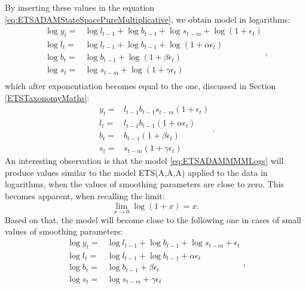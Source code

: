 \documentclass[]{book}
\theoremstyle{definition}
\theoremstyle{definition}
\theoremstyle{definition}
\theoremstyle{definition}
\theoremstyle{remark}
\begin{document}
By inserting these values in the equation \eqref{eq:ETSADAMStateSpacePureMultiplicative}, we obtain model in logarithms:
\begin{equation}
    \begin{aligned}
        \log y_t = & \log l_{t-1} + \log b_{t-1} + \log s_{t-m} + \log \left(1 + \epsilon_{t} \right) \\
        \log l_{t} = & \log l_{t-1} + \log b_{t-1} + \log( 1  + \alpha \epsilon_{t}) \\ 
        \log b_{t} = & \log b_{t-1} + \log( 1  + \beta \epsilon_{t}) \\
        \log s_{t} = & \log s_{t-m} + \log( 1  + \gamma \epsilon_{t}) \\
    \end{aligned} ,
    \label{eq:ETSADAMMMMLogs}
\end{equation}
which after exponentiation becomes equal to the one, discussed in Section \ref{ETSTaxonomyMaths}:
\begin{equation}
  \begin{aligned}
    y_{t} = & l_{t-1} b_{t-1} s_{t-m} (1 + \epsilon_t) \\
    l_t = & l_{t-1} b_{t-1} (1 + \alpha \epsilon_t) \\
    b_t = & b_{t-1} (1 + \beta \epsilon_t) \\
    s_t = & s_{t-m} (1 + \gamma \epsilon_t) 
  \end{aligned}.
  \label{eq:ETSADAMMMM}
\end{equation}
An interesting observation is that the model \eqref{eq:ETSADAMMMMLogs} will produce values similar to the model ETS(A,A,A) applied to the data in logarithms, when the values of smoothing parameters are close to zero. This becomes apparent, when recalling the limit:
\begin{equation}
  \lim\limits_{x \to 0}\log(1+x) = x .
  \label{eq:limitOf1x}
\end{equation}
Based on that, the model will become close to the following one in cases of small values of smoothing parameters:
\begin{equation}
    \begin{aligned}
        \log y_t = & \log l_{t-1} + \log b_{t-1} + \log s_{t-m} + \epsilon_{t} \\
        \log l_{t} = & \log l_{t-1} + \log b_{t-1} + \alpha \epsilon_{t} \\ 
        \log b_{t} = & \log b_{t-1} + \beta \epsilon_{t} \\
        \log s_{t} = & \log s_{t-m} + \gamma \epsilon_{t} \\
    \end{aligned} ,
    \label{eq:ETSADAMMMMLogsEquivalent}
\end{equation}
\end{document}
